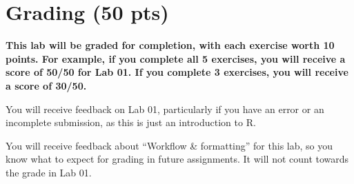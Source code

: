 \documentclass[
  letterpaper,
  DIV=11,
  numbers=noendperiod]{scrartcl}
\begin{document}
\section{Grading (50 pts)}\label{grading-50-pts}

\textbf{This lab will be graded for completion, with each exercise worth
10 points. For example, if you complete all 5 exercises, you will
receive a score of 50/50 for Lab 01. If you complete 3 exercises, you
will receive a score of 30/50.}

You will receive feedback on Lab 01, particularly if you have an error
or an incomplete submission, as this is just an introduction to R.

You will receive feedback about ``Workflow \& formatting'' for this lab,
so you know what to expect for grading in future assignments. It will
not count towards the grade in Lab 01.
\end{document}
